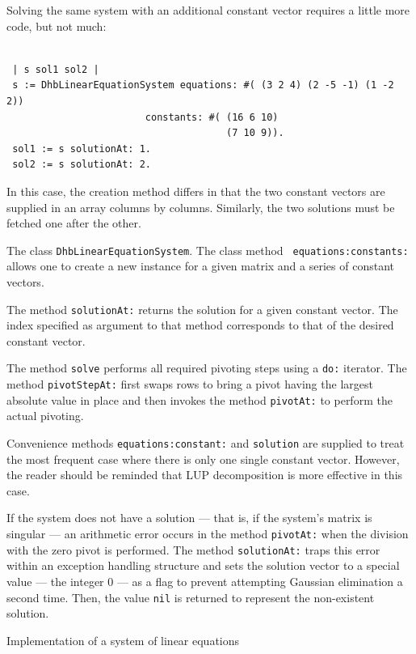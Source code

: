 \documentclass[twoside]{book}
\begin{document}
Solving the same system with an additional constant vector
requires a little more code, but not much:
\begin{codeExample}
\begin{verbatim}

 | s sol1 sol2 |
 s := DhbLinearEquationSystem equations: #( (3 2 4) (2 -5 -1) (1 -2 2))
                        constants: #( (16 6 10)
                                      (7 10 9)).
 sol1 := s solutionAt: 1.
 sol2 := s solutionAt: 2.
\end{verbatim}
\end{codeExample}
In this case, the creation method differs in that the two constant
vectors are supplied in an array columns by columns. Similarly,
the two solutions must be fetched one after the other.

The class {\tt DhbLinearEquationSystem}. The class method {\tt
equations:constants:} allows one to create a new instance for a given
matrix and a series of constant vectors.

The method {\tt solutionAt:} returns the solution for a given
constant vector. The index specified as argument to that method
corresponds to that of the desired constant vector.


The method {\tt solve} performs all required pivoting steps using
a {\tt do:} iterator. The method {\tt pivotStepAt:} first swaps
rows to bring a pivot having the largest absolute value in place
and then invokes the method {\tt pivotAt:} to perform the actual
pivoting.

Convenience methods {\tt equations:constant:} and {\tt solution}
are supplied to treat the most frequent case where there is only
one single constant vector. However, the reader should be reminded
that LUP decomposition is more effective in this case.

If the system does not have a solution --- that is, if the
system's matrix is singular --- an arithmetic error occurs in the
method {\tt pivotAt:} when the division with the zero pivot is
performed. The method {\tt solutionAt:} traps this error within an
exception handling structure and sets the solution vector to a
special value --- the integer 0 --- as a flag to prevent
attempting Gaussian elimination a second time. Then, the value
{\tt nil} is returned to represent the non-existent solution.

\begin{listing} Implementation of a system of linear equations
\label{ls:lineqs}

\end{listing}
\end{document}
